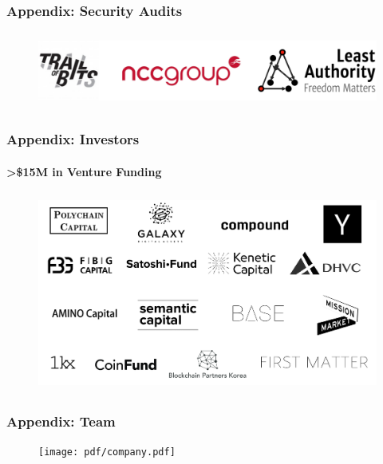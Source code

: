 \documentclass[xetex,mathsans,sans,aspectratio=169]{beamer}
\begin{document}
    \begin{frame}
        \frametitle{Appendix: Security Audits}
        \begin{figure}
            \centering
            \includegraphics[height=2.5cm]{pdf/security-audits.pdf}
      \end{figure}
    \end{frame}

    \begin{frame}
      \frametitle{Appendix: Investors}
        \framesubtitle{>\$15M in Venture Funding}
        \begin{figure}
            \centering
            \includegraphics[height=6.5cm]{pdf/investors.pdf}
        \end{figure}
    \end{frame}

    \begin{frame}
      \frametitle{Appendix: Team}
        \begin{figure}
            \centering
            \texttt{[image: pdf/company.pdf]}
        \end{figure}
    \end{frame}
\end{document}
